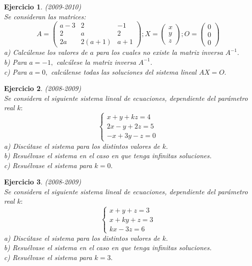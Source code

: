 \documentclass[12pt, a4paper]{amsart}
\newtheorem{ejer}{Ejercicio}
\begin{document}
\begin{ejer}\em (2009-2010)\\
Se consideran las matrices:
\begin{equation*}
A=\begin{pmatrix}
a-3 & 2 & -1
\\2 & a & 2
\\ 2a & 2(a+1) & a+1 \end{pmatrix};
X=\begin{pmatrix}
x
\\ y 
\\ z \end{pmatrix};
O=\begin{pmatrix}
0
\\ 0
\\0 \end{pmatrix}
\end{equation*}
a) Calcúlense los valores de $a$ para los cuales no existe la matriz inversa $A^{-1}.$\\
b) Para $a=-1,$ calcúlese la matriz inversa  $A^{-1}.$\\
c) Para $a=0,$ calcúlense todas las soluciones del sistema lineal $AX=O.$
\end{ejer}


\begin{ejer}\em (2008-2009)\\
Se considera el siguiente sistema lineal de ecuaciones, dependiente del parámetro real $k:$
\begin{equation*}
\left \{ \begin{matrix} x+y+kz=4
\\ 2x-y+2z=5
\\ -x+3y-z=0 \end{matrix}\right. 
\end{equation*}
a) Discútase el sistema para los distintos valores de $k.$\\
b) Resuélvase el sistema en el caso en que tenga infinitas soluciones.\\
c) Resuélvase el sistema para $k=0.$
\end{ejer}

\begin{ejer}\em  (2008-2009)\\
Se considera el siguiente sistema lineal de ecuaciones, dependiente del parámetro real $k:$
\begin{equation*}
\left \{ \begin{matrix} x+y+z=3
\\ x+ky+z=3
\\ kx-3z=6 \end{matrix}\right. 
\end{equation*}
a) Discútase el sistema para los distintos valores de $k.$\\
b) Resuélvase el sistema en el caso en que tenga infinitas soluciones.\\
c) Resuélvase el sistema para $k=3.$
\end{ejer}
\end{document}
